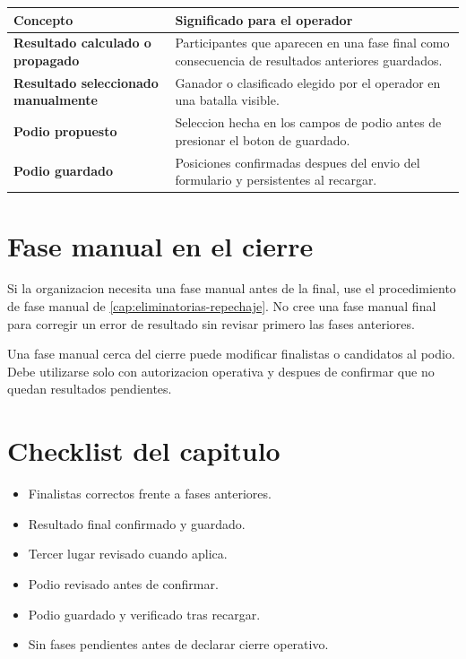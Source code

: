 \begin{tabularx}{\linewidth}{>{\bfseries}p{4cm}X}
\toprule
Concepto & Significado para el operador\\
\midrule
Resultado calculado o propagado & Participantes que aparecen en una fase final como consecuencia de resultados anteriores guardados.\\
Resultado seleccionado manualmente & Ganador o clasificado elegido por el operador en una batalla visible.\\
Podio propuesto & Seleccion hecha en los campos de podio antes de presionar el boton de guardado.\\
Podio guardado & Posiciones confirmadas despues del envio del formulario y persistentes al recargar.\\
\bottomrule
\end{tabularx}

\section{Fase manual en el cierre}

Si la organizacion necesita una fase manual antes de la final, use el procedimiento de fase manual de \cref{cap:eliminatorias-repechaje}. No cree una fase manual final para corregir un error de resultado sin revisar primero las fases anteriores.

\begin{operacionsensible}
Una fase manual cerca del cierre puede modificar finalistas o candidatos al podio. Debe utilizarse solo con autorizacion operativa y despues de confirmar que no quedan resultados pendientes.
\end{operacionsensible}

\section{Checklist del capitulo}

\begin{itemize}
    \item Finalistas correctos frente a fases anteriores.
    \item Resultado final confirmado y guardado.
    \item Tercer lugar revisado cuando aplica.
    \item Podio revisado antes de confirmar.
    \item Podio guardado y verificado tras recargar.
    \item Sin fases pendientes antes de declarar cierre operativo.
\end{itemize}
